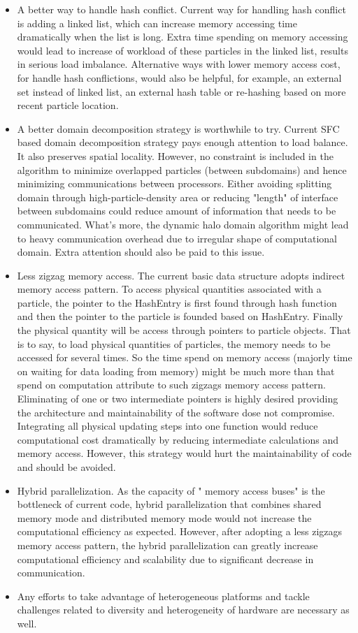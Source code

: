 \begin{itemize}
\item A better way to handle hash conflict. Current way for handling hash conflict is adding a linked list, which can increase memory accessing time dramatically when the list is long. Extra time spending on memory accessing would lead to increase of workload of these particles in the linked list, results in serious load imbalance. Alternative ways with lower memory access cost, for handle hash conflictions, would also be helpful, for example, an external set instead of linked list, an external hash table or re-hashing based on more recent particle location.
\item A better domain decomposition strategy is worthwhile to try. Current SFC based domain decomposition strategy pays enough attention to load balance. It also preserves spatial locality. However, no constraint is included in the algorithm to minimize overlapped particles (between subdomains) and hence minimizing communications between processors. Either avoiding splitting domain through high-particle-density area or reducing "length" of interface between subdomains could reduce amount of information that needs to be communicated. What's more, the dynamic halo domain algorithm might lead to heavy communication overhead due to irregular shape of computational domain. Extra attention should also be paid to this issue.
\item Less zigzag memory access. The current basic data structure adopts indirect memory access pattern. To access physical quantities associated with a particle, the pointer to the HashEntry is first found through hash function and then the pointer to the particle is founded based on HashEntry. Finally the physical quantity will be access through pointers to particle objects. That is to say, to load physical quantities of particles, the memory needs to be accessed for several times.
So the time spend on memory access (majorly time on waiting for data loading from memory) might be much more than that spend on computation attribute to such zigzags memory access pattern. Eliminating of one or two intermediate pointers is highly desired providing the architecture and maintainability of the software dose not compromise. Integrating all physical updating steps into one function would reduce computational cost dramatically by reducing intermediate calculations and memory access. However, this strategy would hurt the maintainability of code and should be avoided.
\item Hybrid parallelization. As the capacity of " memory access buses" is the bottleneck of current code, hybrid parallelization that combines shared memory mode and distributed memory mode would not increase the computational efficiency as expected. However, after adopting a less zigzags memory access pattern, the hybrid parallelization can greatly increase computational efficiency and scalability due to significant decrease in communication.
\item Any efforts to take advantage of heterogeneous platforms and tackle challenges related to diversity and heterogeneity of hardware are necessary as well.
\end{itemize}

